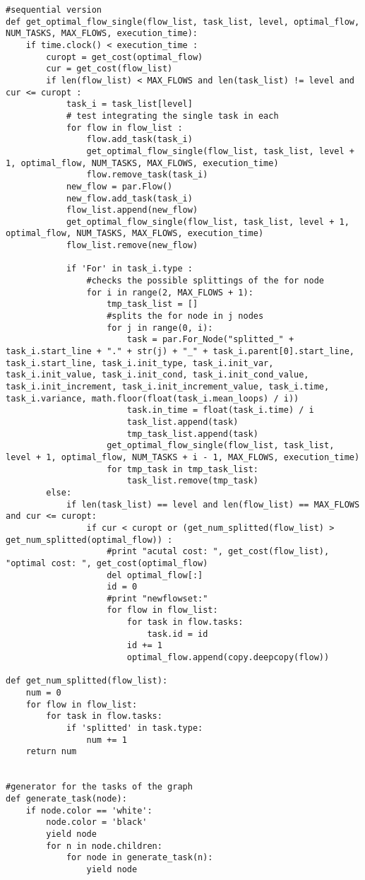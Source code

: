 \documentclass[a4paper,10pt,twoside]{book}
\begin{document}
\begin{lstlisting}[language=CCC, caption=schedule.py]
#sequential version
def get_optimal_flow_single(flow_list, task_list, level, optimal_flow, NUM_TASKS, MAX_FLOWS, execution_time):
	if time.clock() < execution_time :
		curopt = get_cost(optimal_flow)
		cur = get_cost(flow_list)
		if len(flow_list) < MAX_FLOWS and len(task_list) != level and cur <= curopt :
			task_i = task_list[level]
			# test integrating the single task in each
			for flow in flow_list :
				flow.add_task(task_i)
				get_optimal_flow_single(flow_list, task_list, level + 1, optimal_flow, NUM_TASKS, MAX_FLOWS, execution_time)
				flow.remove_task(task_i)
			new_flow = par.Flow()		
			new_flow.add_task(task_i)
			flow_list.append(new_flow)
			get_optimal_flow_single(flow_list, task_list, level + 1, optimal_flow, NUM_TASKS, MAX_FLOWS, execution_time)
			flow_list.remove(new_flow)
			
			if 'For' in task_i.type :
				#checks the possible splittings of the for node
				for i in range(2, MAX_FLOWS + 1):
					tmp_task_list = []
					#splits the for node in j nodes
					for j in range(0, i):
						task = par.For_Node("splitted_" + task_i.start_line + "." + str(j) + "_" + task_i.parent[0].start_line, task_i.start_line, task_i.init_type, task_i.init_var, task_i.init_value, task_i.init_cond, task_i.init_cond_value, task_i.init_increment, task_i.init_increment_value, task_i.time, task_i.variance, math.floor(float(task_i.mean_loops) / i))
						task.in_time = float(task_i.time) / i
						task_list.append(task)
						tmp_task_list.append(task)
					get_optimal_flow_single(flow_list, task_list, level + 1, optimal_flow, NUM_TASKS + i - 1, MAX_FLOWS, execution_time)
					for tmp_task in tmp_task_list:
						task_list.remove(tmp_task)		
		else:
			if len(task_list) == level and len(flow_list) == MAX_FLOWS and cur <= curopt:
				if cur < curopt or (get_num_splitted(flow_list) > get_num_splitted(optimal_flow)) :
					#print "acutal cost: ", get_cost(flow_list), "optimal cost: ", get_cost(optimal_flow)
					del optimal_flow[:]
					id = 0
					#print "newflowset:"
					for flow in flow_list:
						for task in flow.tasks:
							task.id = id
						id += 1
						optimal_flow.append(copy.deepcopy(flow))

def get_num_splitted(flow_list):
	num = 0
	for flow in flow_list:
		for task in flow.tasks:
			if 'splitted' in task.type:
				num += 1
	return num

				
#generator for the tasks of the graph
def generate_task(node):
	if node.color == 'white':
		node.color = 'black'
		yield node
		for n in node.children:
			for node in generate_task(n):
				yield node


\end{lstlisting}
\end{document}
